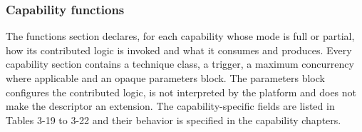 \hypertarget{capability-functions}{%
\subsubsection{Capability functions}\label{capability-functions}}

The functions section declares, for each capability whose mode is full
or partial, how its contributed logic is invoked and what it consumes
and produces. Every capability section contains a technique class, a
trigger, a maximum concurrency where applicable and an opaque parameters
block. The parameters block configures the contributed logic, is not
interpreted by the platform and does not make the descriptor an
extension. The capability-specific fields are listed in Tables 3-19 to
3-22 and their behavior is specified in the capability chapters.

